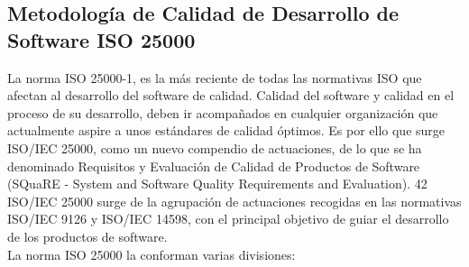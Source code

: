 \documentclass[preprint,12pt]{elsarticle}
\begin{document}

	\subsection{\textbf{Metodología de Calidad de Desarrollo de Software ISO 25000}}
	La norma ISO 25000-1, es la más reciente de todas las normativas ISO que afectan al desarrollo del software de calidad. Calidad del software y calidad en el proceso de su desarrollo, deben ir acompañados en cualquier organización que actualmente aspire a unos estándares de calidad óptimos. Es por ello que surge ISO/IEC 25000, como un nuevo compendio de actuaciones, de lo que se ha denominado Requisitos y Evaluación de Calidad de Productos de Software (SQuaRE - System and Software Quality Requirements and Evaluation). 42 ISO/IEC 25000 surge de la agrupación de actuaciones recogidas en las normativas ISO/IEC 9126 y ISO/IEC 14598, con el principal objetivo de guiar el desarrollo de los productos de software.
\\
La norma ISO 25000 la conforman varias divisiones: 
\end{document}

